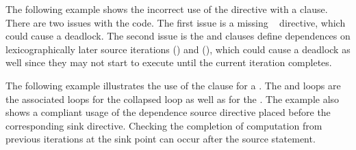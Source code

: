 


The following example shows the incorrect use of the  
directive with a  clause.  There are two issues with the code.  
The first issue is a missing ~ directive,
which could cause a deadlock.  
The second issue is the  and  
clauses define dependences on lexicographically later 
source iterations () and (), which could cause 
a deadlock as well since they may not start to execute until the current iteration completes.




The following example illustrates the use of the  clause for
a .  The  and  loops are the associated
loops for the collapsed loop as well as for the .
The example also shows a compliant usage of the dependence source
directive placed before the corresponding sink directive.
Checking the completion of computation from previous iterations at the sink point can occur after the source statement.


